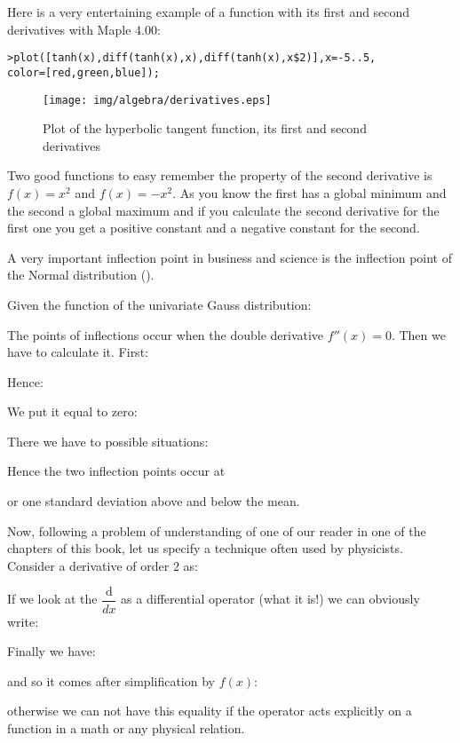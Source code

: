 Here is a very entertaining example of a function with its first and second derivatives with Maple 4.00:

\texttt{>plot([tanh(x),diff(tanh(x),x),diff(tanh(x),x\$2)],x=-5..5,\\color=[red,green,blue]);}

\begin{figure}[H]
\centering
\texttt{[image: img/algebra/derivatives.eps]}
\caption{Plot of the hyperbolic tangent function, its first and second derivatives}
\end{figure}

	\begin{tcolorbox}[title=Remark,colframe=black,arc=10pt]
Two good functions to easy remember the property of the second derivative is $f(x)=x^2$ and $f(x)=-x^2$. As you know the first has a global minimum and the second a global maximum and if you calculate the second derivative for the first one you get a positive constant and a negative constant for the second.
	\end{tcolorbox}
	
	A very important inflection point in business and science is the inflection point of the Normal distribution ().
	
	Given the function of the univariate Gauss distribution:
	
	The points of inflections occur when the double derivative $f''(x)=0$. Then we have to calculate it. First:
	
	Hence:
	
	We put it equal to zero:
	
	There we have to possible situations:
	
	Hence the two inflection points occur at 
	
	or one standard deviation above and below the mean.

Now, following a problem of understanding of one of our reader in one of the chapters of this book, let us specify a technique often used by physicists. Consider a derivative of order $2$ as:
	
If we look at the $\dfrac{\mathrm{d}}{dx}$ as a differential operator (what it is!) we can obviously write:
	
Finally we have:
	
and so it comes after simplification by $f(x)$:
	
otherwise we can not have this equality if the operator acts explicitly on a function in a math or any physical relation.

